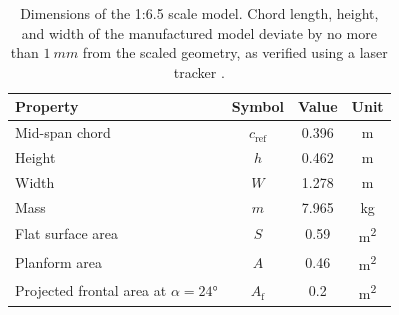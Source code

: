 \documentclass[wes, manuscript]{copernicus}
\begin{document}
\begin{table}[htp]
    \caption{Dimensions of the 1:6.5 scale model. Chord length, height, and width of the manufactured model deviate by no more than $1~\unit{mm}$ from the scaled geometry, as verified using a laser tracker \citep{Poland2026a}.}
    \centering
    \begin{tabular}{l c c c}
        \hline
        \textbf{Property} & \textbf{Symbol} & \textbf{Value} & \textbf{Unit} \\
        \hline
        Mid-span chord & $c_{\textrm{ref}}$ & 0.396 & \unit{m} \\
        Height & $h$ & 0.462 & \unit{m} \\
        Width & $W$ & 1.278 & \unit{m} \\
        Mass & $m$ & 7.965 & \unit{kg} \\
        Flat surface area & $S$ & 0.59 & \unit{m^2} \\
        Planform area & $A$ & 0.46 & \unit{m^2} \\
        Projected frontal area at $\alpha=24\unit{\degree}$ & $A_{\textrm{f}}$ & 0.2 & \unit{m^2} \\
        \hline
    \end{tabular}
    \label{tab:scale_model_properties}
\end{table}
%
\end{document}
